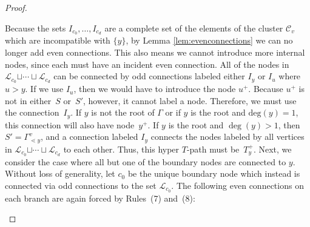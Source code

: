 \documentclass[10pt,a4paper]{amsart}
\numberwithin{equation}{section}
\newcommand{\new}[1]{{#1}}
\begin{document}
\begin{proof}
\begin{center}
\end{center}
Because the sets $I_{c_0},\ldots,I_{c_d}$ are a complete set of the elements of the cluster $\mathcal{C}_v$ which are incompatible with \new{$\{y\}$}, by Lemma \ref{lem:evenconnections} we can no longer add even connections. This also means we cannot introduce more internal nodes, since each must have an incident even connection. All of the nodes in $\mathcal{L}_{c_0} \new{\sqcup \cdots \sqcup} \mathcal{L}_{c_d}$ can be connected by odd connections labeled either $I_y$ or $I_u$ where $u > y$. If we use $I_u$, then we would have to introduce the node $u^+$. Because $u^{+}$ is not in either~$S$ or~$S'$, however, it cannot label a node. Therefore, we must use the connection~$I_y$. If $y$ is not the root of $\Gamma$ or if $y$ is the root and $\textrm{deg}(y) = 1$, this connection will also have node~$y^+$. If $y$ is the root and $\deg(y) > 1$, then $S' = \Gamma_{\lessdot y}^v$, and a connection labeled $I_y$ connects the nodes labeled by all vertices in $\mathcal{L}_{c_0} \new{\sqcup \cdots \sqcup} \mathcal{L}_{c_d}$ to each other. Thus, this hyper $T$-path must be~$T_y^{+}$.
Next, we consider the case where all but one of the boundary nodes are connected to $y$. Without loss of generality, let $c_0$ be the unique boundary node which instead is connected via odd connections to the set $\mathcal{L}_{c_0}$. The following even connections on each branch are again forced by Rules~(7) and~(8):
\begin{center}
\end{center}
\end{proof}
\end{document}

